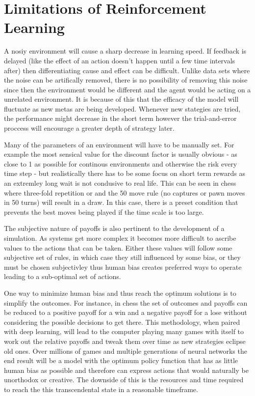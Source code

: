 \documentclass[10pt,a4paper]{report}
\begin{document}
		\section{Limitations of Reinforcement Learning}
			A nosiy environment will cause a sharp decrease in learning speed. If feedback is delayed (like the effect of an action doesn't happen until a few time intervals after)
			then differentiating cause and effect can be difficult. Unlike data sets where the noise can be artifically removed, there is no possibility of removing
			this noise since then the environment would be different and the agent would be acting on a unrelated environment. It is because of this that the efficacy
			of the model will fluctuate as new metas are being developed. Whenever new stategies are tried, the performance might decrease in the short term however
			the trial-and-error proccess will encourage a greater depth of strategy later. \par
			Many of the parameters of an environment will have to be manually set. For example the most sensical value for the discount factor is
			usually obvious - as close to 1 as possible for continous environments and otherwise the risk every time step - but realistically there has
			to be some focus on short term rewards as an extremley long wait is not condusive to real life. This can be seen in chess where three-fold repetition
			or and the 50 move rule (no captures or pawn moves in 50 turns) will result in a draw. In this case, there is a preset condition that prevents the best moves
			being played if the time scale is too large. \par
			The subjective nature of payoffs is also pertinent to the development of a simulation. As systems get more complex it becomes more difficult to ascribe
			values to the actions that can be taken. Either these values will follow some subjective set of rules, in which case they still influenced by some bias, or they
			must be chosen subjectivley thus human bias creates preferred ways to operate leading to a sub-optimal set of actions. \par
			 One way to minimize human bias and thus
			reach the optimum solutions is to simplify the outcomes. For instance, in chess the set of outcomes and payoffs can be reduced to a positive payoff for a win and a
			negative payoff for a lose without considering the possible decisions to get there. This methodology, when paired with deep learning, will lead to the computer playing
			many games with itself to work out the relative payoffs and tweak them over time as new strategies eclipse old ones. Over millions of games and multiple generations
			of neural networks the end result will be a model with the optimum policy function that has as little human bias as possible and therefore can express actions that would
			naturally be unorthodox or creative. The downside of this is the resources and time required to reach the this transcendental state in a reasonable timeframe.
\end{document}
